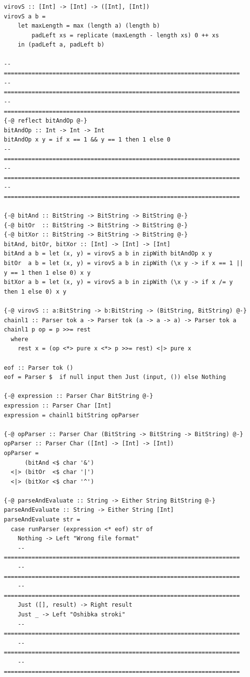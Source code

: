 \documentclass[areasetadvanced]{scrartcl}
\begin{document}
\begin{lstlisting}[caption={Исправленный код}, label=lst:main]
virovS :: [Int] -> [Int] -> ([Int], [Int])
virovS a b =
    let maxLength = max (length a) (length b)
        padLeft xs = replicate (maxLength - length xs) 0 ++ xs
    in (padLeft a, padLeft b)

-- ====================================================================
-- ====================================================================
-- ====================================================================
{-@ reflect bitAndOp @-}
bitAndOp :: Int -> Int -> Int
bitAndOp x y = if x == 1 && y == 1 then 1 else 0
-- ====================================================================
-- ====================================================================
-- ====================================================================

{-@ bitAnd :: BitString -> BitString -> BitString @-}
{-@ bitOr  :: BitString -> BitString -> BitString @-}
{-@ bitXor :: BitString -> BitString -> BitString @-}
bitAnd, bitOr, bitXor :: [Int] -> [Int] -> [Int]
bitAnd a b = let (x, y) = virovS a b in zipWith bitAndOp x y  
bitOr  a b = let (x, y) = virovS a b in zipWith (\x y -> if x == 1 || y == 1 then 1 else 0) x y
bitXor a b = let (x, y) = virovS a b in zipWith (\x y -> if x /= y then 1 else 0) x y

{-@ virovS :: a:BitString -> b:BitString -> (BitString, BitString) @-}
chainl1 :: Parser tok a -> Parser tok (a -> a -> a) -> Parser tok a
chainl1 p op = p >>= rest
  where
    rest x = (op <*> pure x <*> p >>= rest) <|> pure x

eof :: Parser tok ()
eof = Parser $  if null input then Just (input, ()) else Nothing

{-@ expression :: Parser Char BitString @-}
expression :: Parser Char [Int]
expression = chainl1 bitString opParser

{-@ opParser :: Parser Char (BitString -> BitString -> BitString) @-}
opParser :: Parser Char ([Int] -> [Int] -> [Int])
opParser =
      (bitAnd <$ char '&')
  <|> (bitOr  <$ char '|')
  <|> (bitXor <$ char '^')

{-@ parseAndEvaluate :: String -> Either String BitString @-}
parseAndEvaluate :: String -> Either String [Int]
parseAndEvaluate str =
  case runParser (expression <* eof) str of
    Nothing -> Left "Wrong file format"
    -- ====================================================================
    -- ====================================================================
    -- ====================================================================
    Just ([], result) -> Right result  
    Just _ -> Left "Oshibka stroki"
    -- ====================================================================
    -- ====================================================================
    -- ====================================================================


\end{lstlisting}
\end{document}
